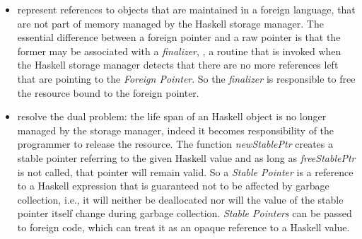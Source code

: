 \begin{itemize}
\item {} represent references to objects that are maintained in a foreign language, \ie that are not part of memory managed by the Haskell storage manager.
The essential difference between a foreign pointer and a raw pointer is that the former may be associated with a \emph{finalizer}, \ie, a routine that is invoked when the Haskell storage manager detects that there are no more references left that are pointing to the \emph{Foreign Pointer}.
So the \emph{finalizer} is responsible to free the resource bound to the foreign pointer. 

\item {}\label{ffi:stableptr} resolve the dual problem: the life span of an Haskell object is no longer managed by the storage manager, indeed it becomes responsibility of the programmer to release the resource.
The function \emph{newStablePtr} creates a stable pointer referring to the given Haskell value and as long as \emph{freeStablePtr} is not called, that pointer will remain valid.
So a \emph{Stable Pointer} is a reference to a Haskell expression that is guaranteed not to be affected by garbage collection, i.e., it will neither be deallocated nor will the value of the stable pointer itself change during garbage collection. \emph{Stable Pointers} can be passed to foreign code, which can treat it as an opaque reference to a Haskell value. 
\end{itemize}